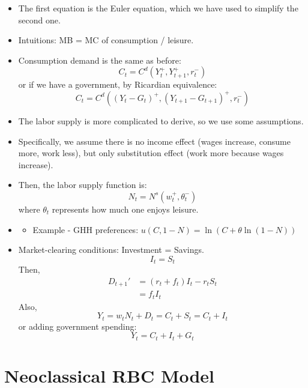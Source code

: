 \documentclass[notitlepage]{article}
\begin{document}
\begin{itemize}
\begin{itemize}
\begin{align*}
\begin{cases}
\end{cases}
\end{align*}
\item The first equation is the Euler equation, which we have used to simplify the second one.
\item Intuitions: MB = MC of consumption / leisure.
\item Consumption demand is the same as before:
\[
C_t = C^d(Y_t^+, Y_{t+1}^+, r_t^-)
\]
or if we have a government, by Ricardian equivalence:
\[
C_t = C^d((Y_t-G_t)^+, (Y_{t+1}-G_{t+1})^+, r_t^-)
\]
\item The labor supply is more complicated to derive, so we use some assumptions.
\item Specifically, we assume there is no income effect (wages increase, consume more, work less), but only substitution effect (work more because wages increase).
\item Then, the labor supply function is:
\[
N_t = N^s(w_t^+, \theta_t^-)
\]
where $\theta_t$ represents how much one enjoys leisure.

\end{itemize}
\end{itemize}

\begin{figure}[h]
    \centering
    \resizebox{0.3\textwidth}{!}{
    
    }
\end{figure}

\begin{itemize}
\item []
\begin{itemize}
\item Example - GHH preferences: $u(C, 1-N) = \ln(C+\theta\ln(1-N))$
\end{itemize}
\end{itemize}

\begin{itemize}
\item Market-clearing conditions: Investment = Savings.
\[
I_t = S_t
\]
Then,
\begin{align*}
D_{t+1}' &= (r_t+f_t)I_t-r_tS_t  \\
&= f_tI_t
\end{align*}
Also,
\[
Y_t = w_tN_t + D_t = C_t + S_t = C_t + I_t
\]
or adding government spending:
\[
Y_t = C_t + I_t + G_t
\]
\end{itemize}

\section{Neoclassical RBC Model}
\end{document}
